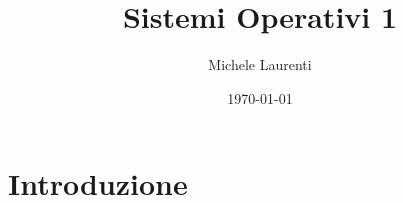 \documentclass[12pt,a4paper]{article}
\begin{document}
\title{Sistemi Operativi 1}
\author{Michele Laurenti}
\date{\today}

\maketitle

\newpage


\tableofcontents
\newpage

\section{Introduzione}


\end{document}
